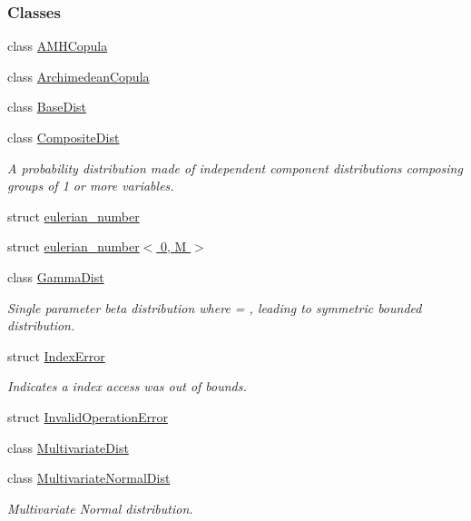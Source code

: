 \subsubsection*{Classes}
\begin{DoxyCompactItemize}
\item 
class \hyperlink{classprior__hessian_1_1AMHCopula}{A\+M\+H\+Copula}
\item 
class \hyperlink{classprior__hessian_1_1ArchimedeanCopula}{Archimedean\+Copula}
\item 
class \hyperlink{classprior__hessian_1_1BaseDist}{Base\+Dist}
\item 
class \hyperlink{classprior__hessian_1_1CompositeDist}{Composite\+Dist}
\begin{DoxyCompactList}\small\item\em A probability distribution made of independent component distributions composing groups of 1 or more variables. \end{DoxyCompactList}\item 
struct \hyperlink{structprior__hessian_1_1eulerian__number}{eulerian\+\_\+number}
\item 
struct \hyperlink{structprior__hessian_1_1eulerian__number_3_010_00_01M_01_4}{eulerian\+\_\+number$<$ 0, M $>$}
\item 
class \hyperlink{classprior__hessian_1_1GammaDist}{Gamma\+Dist}
\begin{DoxyCompactList}\small\item\em Single parameter beta distribution where  = , leading to symmetric bounded distribution. \end{DoxyCompactList}\item 
struct \hyperlink{structprior__hessian_1_1IndexError}{Index\+Error}
\begin{DoxyCompactList}\small\item\em Indicates a index access was out of bounds. \end{DoxyCompactList}\item 
struct \hyperlink{structprior__hessian_1_1InvalidOperationError}{Invalid\+Operation\+Error}
\item 
class \hyperlink{classprior__hessian_1_1MultivariateDist}{Multivariate\+Dist}
\item 
class \hyperlink{classprior__hessian_1_1MultivariateNormalDist}{Multivariate\+Normal\+Dist}
\begin{DoxyCompactList}\small\item\em Multivariate Normal distribution. \end{DoxyCompactList}\item 

\end{DoxyCompactItemize}
